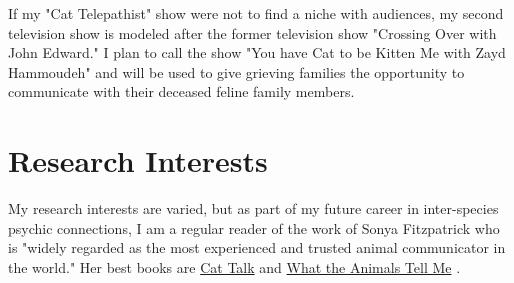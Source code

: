 \documentclass{article}
\begin{document}
If my "Cat Telepathist" show were not to find a niche with audiences, my second television show is modeled after the former television show "Crossing Over with John Edward." \cite{calderwood} I plan to call the show "You have Cat to be Kitten Me with Zayd Hammoudeh" and will be used to give grieving families the opportunity to communicate with their deceased feline family members.

\section{Research Interests}

My research interests are varied, but as part of my future career in inter-species psychic connections, I am a regular reader of the work of Sonya Fitzpatrick who is "widely regarded as the most experienced and trusted animal communicator in the world." \cite{fitzpatrick_2013}  Her best books are \underline{Cat Talk} \cite{fitzpatrick2003cat} and \underline{What the Animals Tell Me} \cite{fitzpatrick_smith_1997}.




\end{document}
